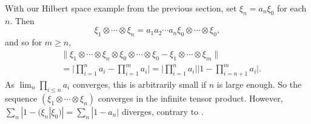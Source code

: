 \documentclass[twoside,a4paper,12pt]{article}
\theoremstyle{plain}
\theoremstyle{definition}
\begin{document}
With our Hilbert space example from the previous section, set $\xi_n = a_n \xi_0$ for each $n$.  Then 
\[ \xi_1 \otimes\cdots \otimes \xi_n = a_1a_2\cdots a_n \xi_0\otimes\cdots\otimes\xi_0, \]
and so for $m \geq n$,
\begin{align*}
& \| \xi_1\otimes\cdots\otimes\xi_n\otimes\xi_0\otimes\cdots\otimes\xi_0 - \xi_1\otimes\cdots\otimes\xi_m \| \\
&= \Big| \prod_{i=1}^n a_i - \prod_{i=1}^m a_i \Big|
= \Big| \prod_{i=1}^n a_i \Big| \Big| 1 - \prod_{i=n+1}^m a_i \Big|.
\end{align*}
As $\lim_n \prod_{i\leq n} a_i$ converges, this is arbitrarily small if $n$ is large enough.  So the sequence $(\xi_1\otimes\cdots\otimes\xi_n)$ converges in the infinite tensor product.  However, $\sum_n |1-(\xi_n|\xi_0)| = \sum_n |1-a_n|$ diverges, contrary to \cite[Lemma~XIV.1.7]{tak3}.
\end{document}
